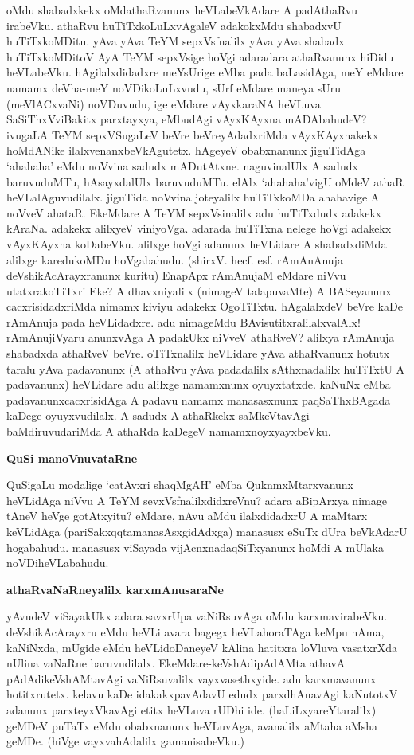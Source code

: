 oMdu shabadxkekx oMdathaRvanunx heVLabeVkAdare A padAthaRvu irabeVku. 
athaRvu huTiTxkoLuLxvAgaleV adakokxMdu shabadxvU huTiTxkoMDitu. yAva 
yAva TeYM sepxVsfnalilx yAva yAva shabadx huTiTxkoMDitoV AyA TeYM 
sepxVsige hoVgi adaradara athaRvanunx hiDidu heVLabeVku. 
hAgilalxdidadxre meYsUrige eMba pada baLasidAga, meY eMdare namamx 
deVha-meY noVDikoLuLxvudu, sUrf eMdare maneya sUru (meVlACxvaNi) 
noVDuvudu, ige eMdare vAyxkaraNA heVLuva SaSiThxVviBakitx parxtayxya, 
eMbudAgi vAyxKAyxna mADAbahudeV? ivugaLA TeYM sepxVSugaLeV beVre beVreyAdadxriMda vAyxKAyxnakekx hoMdANike  ilalxvenanxbeVkAgutetx. hAgeyeV obabxnanunx jiguTidAga `ahahaha' eMdu noVvina sadudx mADutAtxne. naguvinalUlx A sadudx baruvuduMTu, hAsayxdalUlx baruvuduMTu. elAlx `ahahaha'vigU oMdeV athaR heVLalAguvudilalx. jiguTida noVvina joteyalilx huTiTxkoMDa ahahavige A noVveV ahataR. EkeMdare A TeYM sepxVsinalilx adu huTiTxdudx adakekx kAraNa. adakekx alilxyeV viniyoVga. adarada huTiTxna nelege hoVgi adakekx vAyxKAyxna koDabeVku. alilxge hoVgi adanunx heVLidare A shabadxdiMda alilxge karedukoMDu hoVgabahudu.  (shirxV. hecf. esf. rAmAnAnuja deVshikAcArayxranunx kuritu) EnapApx rAmAnujaM eMdare niVvu utatxrakoTiTxri Eke? A dhavxniyalilx (nimageV talapuvaMte) A BASeyanunx cacxrisidadxriMda nimamx kiviyu adakekx OgoTiTxtu. hAgalalxdeV beVre kaDe rAmAnuja pada heVLidadxre. adu nimageMdu BAvisutitxralilalxvalAlx! rAmAnujiVyaru anunxvAga A padakUkx niVveV athaRveV? alilxya rAmAnuja shabadxda athaRveV beVre. oTiTxnalilx heVLidare yAva athaRvanunx hotutx taralu yAva padavanunx (A athaRvu yAva padadalilx sAthxnadalilx huTiTxtU A padavanunx) heVLidare adu alilxge namamxnunx oyuyxtatxde.  kaNuNx eMba padavanunxcacxrisidAga A padavu namamx manasasxnunx paqSaThxBAgada kaDege oyuyxvudilalx. A sadudx A athaRkekx saMkeVtavAgi baMdiruvudariMda A athaRda kaDegeV namamxnoyxyayxbeVku.

\textbf{QuSi manoVnuvataRne}

QuSigaLu modalige `catAvxri shaqMgAH' eMba QuknmxMtarxvanunx heVLidAga niVvu A TeYM sevxVsfnalilxdidxreVnu? adara aBipArxya nimage tAneV heVge gotAtxyitu? eMdare, nAvu aMdu ilalxdidadxrU A maMtarx keVLidAga (pariSakxqqtamanasAsxgidAdxga) manasusx eSuTx dUra beVkAdarU hogabahudu. manasusx viSayada vijAcnxnadaqSiTxyanunx hoMdi A mUlaka noVDiheVLabahudu.

\textbf{athaRvaNaRneyalilx karxmAnusaraNe}

yAvudeV viSayakUkx adara savxrUpa vaNiRsuvAga oMdu karxmavirabeVku. 
deVshikAcArayxru eMdu heVLi avara bagegx heVLahoraTAga keMpu nAma, 
kaNiNxda, mUgide eMdu heVLidoDaneyeV kAlina hatitxra loVluva vasatxrXda nUlina vaNaRne baruvudilalx. EkeMdare-keVshAdipAdAMta athavA pAdAdikeVshAMtavAgi vaNiRsuvalilx vayxvasethxyide. adu karxmavanunx hotitxrutetx. kelavu kaDe idakakxpavAdavU edudx parx\-dhAnavAgi kaNutotxV adanunx parxteyxVkavAgi etitx heVLuva rUDhi ide. (haLiLxyareYtaralilx) geMDeV puTaTx eMdu obabxnanunx heVLuvAga, avanalilx aMtaha aMsha geMDe. (hiVge vayxvahAdalilx gamanisabeVku.)


